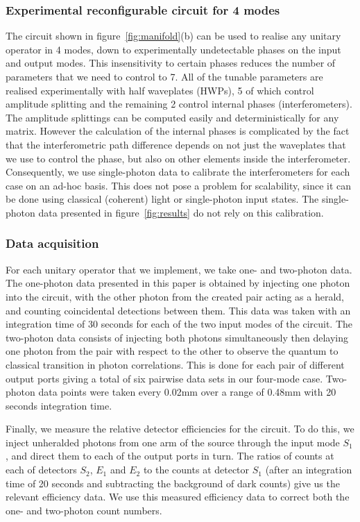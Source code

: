 \subsubsection{Experimental reconfigurable circuit for 4 modes}
The circuit shown in figure~\ref{fig:manifold}(b) can be used to realise any
unitary operator in 4 modes, down to experimentally undetectable phases on the
input and output modes. This insensitivity to certain phases reduces the number
of parameters that we need to control to 7. All of the tunable parameters are
realised experimentally with half waveplates (HWPs), 5 of which control
amplitude splitting and the remaining 2 control internal phases
(interferometers). The amplitude
splittings can be computed easily and deterministically for any matrix. However
the calculation of the internal phases is complicated by the fact that the
interferometric path difference depends on not just the waveplates
that we use to control the phase, but also on other elements inside the
interferometer. Consequently, we use single-photon data to calibrate the
interferometers for each case on an ad-hoc basis. This does not pose a problem
for scalability, since it can be done using classical (coherent) light or
single-photon input states. The single-photon data presented in
figure~\ref{fig:results} do not rely on this calibration.

\subsubsection{Data acquisition}
For each unitary operator that we implement, we take one- and two-photon data.
The one-photon data presented in this paper is obtained by injecting one photon
into the circuit, with the other photon from the created pair acting as a
herald, and counting coincidental detections between them. This data was taken
with an integration time of 30 seconds for each of the two input modes of the
circuit.
The two-photon data consists of injecting both photons simultaneously then
delaying one photon from the pair with respect to the other to observe the
quantum to classical transition in photon correlations. This is done for each
pair of different output ports giving a total of six pairwise data sets in our
four-mode case. Two-photon data points were taken every 0.02mm over a range of
0.48mm with 20 seconds integration time.

Finally, we measure the relative detector efficiencies for the circuit. To do
this, we inject unheralded photons from one arm of the source through the input
mode \(S_1\), and direct them to each of the output ports in turn. The ratios of
counts at each of detectors \(S_2\), \(E_1\) and \(E_2\) to the counts at
detector \(S_1\) (after an integration time of 20 seconds and subtracting the
background of dark counts) give us the relevant efficiency data. We use this
measured efficiency data to correct both the one- and two-photon count numbers.
